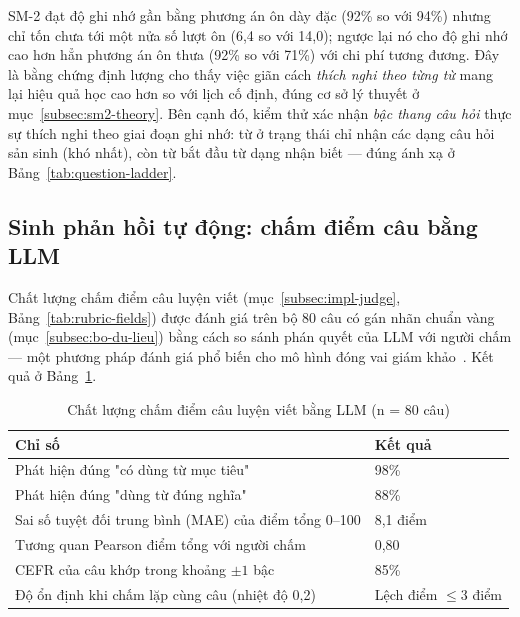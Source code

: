 
SM-2 đạt độ ghi nhớ gần bằng phương án ôn dày đặc (92\% so với 94\%) nhưng chỉ
tốn chưa tới một nửa số lượt ôn (6,4 so với 14,0); ngược lại nó cho độ ghi nhớ
cao hơn hẳn phương án ôn thưa (92\% so với 71\%) với chi phí tương đương. Đây
là bằng chứng định lượng cho thấy việc giãn cách \textit{thích nghi theo từng
từ} mang lại hiệu quả học cao hơn so với lịch cố định, đúng cơ sở lý thuyết ở
mục~\ref{subsec:sm2-theory}. Bên cạnh đó, kiểm thử xác nhận \textit{bậc thang
câu hỏi} thực sự thích nghi theo giai đoạn ghi nhớ: từ ở trạng thái
 chỉ nhận các dạng câu hỏi sản sinh (khó nhất), còn từ
 bắt đầu từ dạng nhận biết --- đúng ánh xạ ở
Bảng~\ref{tab:question-ladder}.

\subsection{Sinh phản hồi tự động: chấm điểm câu bằng LLM}
\label{subsec:eval-judge}

Chất lượng chấm điểm câu luyện viết (mục~\ref{subsec:impl-judge},
Bảng~\ref{tab:rubric-fields}) được đánh giá trên bộ 80 câu có gán nhãn chuẩn
vàng (mục~\ref{subsec:bo-du-lieu}) bằng cách so sánh phán quyết của LLM với
người chấm --- một phương pháp đánh giá phổ biến cho mô hình đóng vai giám
khảo~\cite{zheng2023judging}. Kết quả ở Bảng~\ref{tab:eval-judge}.

\begin{table}[h]
  \centering
  \small
  \renewcommand{\arraystretch}{1.3}
  \begin{tabular}{|p{8.8cm}|p{5.2cm}|}
    \hline
    \textbf{Chỉ số} & \textbf{Kết quả} \\
    \hline
    Phát hiện đúng "có dùng từ mục tiêu" & 98\% \\
    \hline
    Phát hiện đúng "dùng từ đúng nghĩa" & 88\% \\
    \hline
    Sai số tuyệt đối trung bình (MAE) của điểm tổng 0--100 & 8,1 điểm \\
    \hline
    Tương quan Pearson điểm tổng với người chấm & 0,80 \\
    \hline
    CEFR của câu khớp trong khoảng $\pm 1$ bậc & 85\% \\
    \hline
    Độ ổn định khi chấm lặp cùng câu (nhiệt độ 0,2) & Lệch điểm $\le 3$ điểm \\
    \hline
  \end{tabular}
  \caption{Chất lượng chấm điểm câu luyện viết bằng LLM (n = 80 câu)}
  \label{tab:eval-judge}
\end{table}

